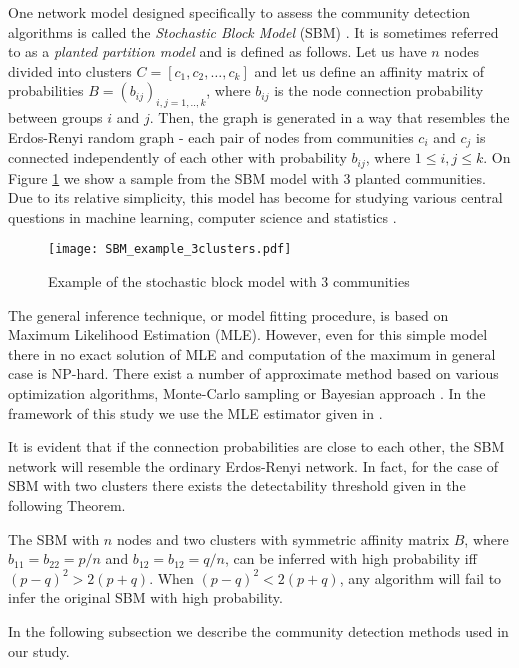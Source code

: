 One network model designed specifically to assess the community detection algorithms is called the \textit{Stochastic Block Model} (SBM) \cite{Abbe2018}. It is sometimes referred to as a \textit{planted partition model} and is defined as follows. Let us have $n$ nodes divided into clusters $C=[c_1,c_2,\dots ,c_k]$ and let us define an affinity matrix of probabilities $B=(b_{ij})_{i,j=1,..,k}$, where  $b_{ij}$ is the node connection probability between groups $i$ and $j$. Then, the graph is generated in a way that resembles the Erdos-Renyi random graph - each pair of nodes from communities $c_i$ and $c_j$ is connected independently of each other with probability $b_{ij}$, where $1\leq i,j\leq k$. On Figure \ref{fig:sbm_example} we show a sample from the SBM model with 3 planted communities. Due to its relative simplicity, this model has become for studying various central questions in machine learning, computer science and statistics \cite{Moore2017}. 

 \begin{figure}[ht]
 \centering
    \texttt{[image: SBM\_example\_3clusters.pdf]}
   \caption{Example of the stochastic block model with 3 communities}
   \label{fig:sbm_example}
 \end{figure}

The general inference technique, or model fitting procedure, is based on Maximum Likelihood Estimation (MLE). However, even for this simple model there in no exact solution of MLE and computation of the maximum in general case is NP-hard. There exist a number of approximate method based on various optimization algorithms, Monte-Carlo sampling or Bayesian approach \cite{BrianNewman2011}. In the framework of this study we use the MLE estimator given in \cite{Peixoto2014}. 

It is evident that if the connection probabilities are close to each other, the SBM network will resemble the ordinary Erdos-Renyi network. In fact, for the case of SBM with two clusters there exists the detectability threshold given in the following Theorem.
\begin{theorem}\label{thm.detectability_SBM}
The SBM with $n$ nodes and two clusters with symmetric affinity matrix $B$, where $b_{11}=b_{22}=p/n$ and $b_{12}=b_{12}=q/n$, can be inferred with high probability iff $(p-q)^2> 2(p+q)$. When $(p-q)^2 < 2(p+q)$, any algorithm will fail to infer the original SBM with high probability. 
\end{theorem}

In the following subsection we describe the community detection methods used in our study.

